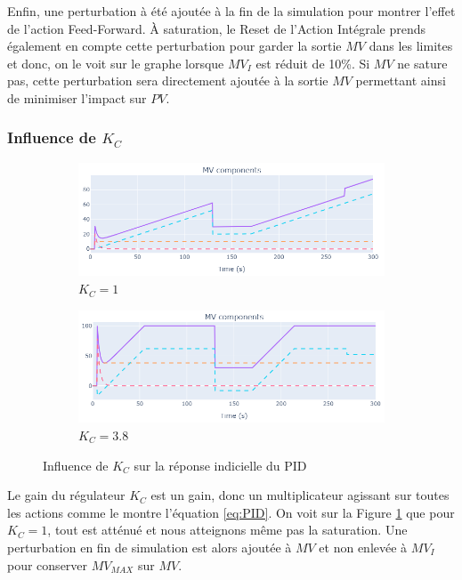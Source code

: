 Enfin, une perturbation à été ajoutée à la fin de la simulation pour montrer l'effet de l'action Feed-Forward.
À saturation, le Reset de l'Action Intégrale prends également en compte cette perturbation pour garder la sortie $MV$ dans les limites et donc, on le voit sur le graphe lorsque $MV_I$ est réduit de 10\%.
Si $MV$ ne sature pas, cette perturbation sera directement ajoutée à la sortie $MV$ permettant ainsi de minimiser l'impact sur $PV$.

\subsubsection{Influence de \texorpdfstring{$K_C$}{Kc}}
\begin{figure}[H]
    \centering
    \begin{subfigure}[b]{0.48\textwidth}
        \includegraphics[width=\textwidth]{../Plots/PID/PID_Response_low_Kc.png}
        \caption{$K_C = 1$}
    \end{subfigure}
    \begin{subfigure}[b]{0.48\textwidth}
        \includegraphics[width=\textwidth]{../Plots/PID/PID_Response_high_Kc.png}
        \caption{$K_C = 3.8$}
    \end{subfigure}
    \caption{Influence de $K_C$ sur la réponse indicielle du PID}
    \label{fig:Kc_Influence_PID}
\end{figure}
Le gain du régulateur $K_C$ est un gain, donc un multiplicateur agissant sur toutes les actions comme le montre l'équation \eqref{eq:PID}.
On voit sur la Figure \ref{fig:Kc_Influence_PID} que pour $K_C = 1$, tout est atténué et nous atteignons même pas la saturation.
Une perturbation en fin de simulation est alors ajoutée à $MV$ et non enlevée à $MV_I$ pour conserver $MV_{MAX}$ sur $MV$.

